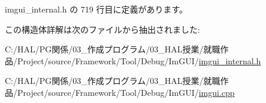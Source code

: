  imgui\+\_\+internal.\+h の 719 行目に定義があります。



この構造体詳解は次のファイルから抽出されました\+:\begin{DoxyCompactItemize}
\item 
C\+:/\+H\+A\+L/\+P\+G関係/03\+\_\+作成プログラム/03\+\_\+\+H\+A\+L授業/就職作品/\+Project/source/\+Framework/\+Tool/\+Debug/\+Im\+G\+U\+I/\mbox{\hyperlink{imgui__internal_8h}{imgui\+\_\+internal.\+h}}\item 
C\+:/\+H\+A\+L/\+P\+G関係/03\+\_\+作成プログラム/03\+\_\+\+H\+A\+L授業/就職作品/\+Project/source/\+Framework/\+Tool/\+Debug/\+Im\+G\+U\+I/\mbox{\hyperlink{imgui_8cpp}{imgui.\+cpp}}\end{DoxyCompactItemize}
